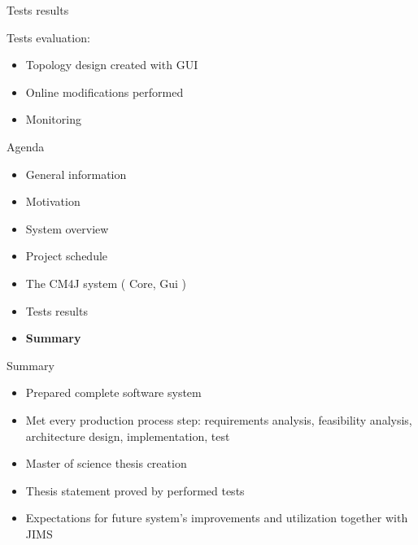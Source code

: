 \documentclass{beamer}
\begin{document}
	\begin{frame}{Tests results}

		Tests evaluation:
		\begin{itemize}
			\item Topology design created with GUI
			\item Online modifications performed
			\item Monitoring
		\end{itemize}

	\end{frame}

	\begin{frame}{Agenda}

		\begin{itemize}
			\item General information
			\item Motivation
			\item System overview
			\item Project schedule
			\item The CM4J system ( Core, Gui )
			\item Tests results
			\item \textbf{Summary}
		\end{itemize}

	\end{frame}

	\begin{frame}{Summary}

		
		\begin{itemize}
			\item Prepared complete software system 
			\item Met every production process step: requirements analysis, feasibility analysis, architecture design, implementation, test
			\item Master of science thesis creation
			\item Thesis statement proved by performed tests
			\item Expectations for future system's improvements and utilization together with JIMS
		\end{itemize}

	\end{frame}
\end{document}
